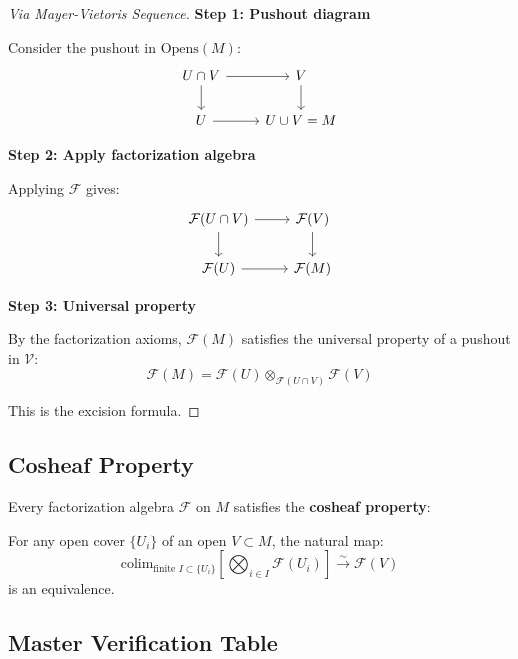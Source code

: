 \begin{example}
\begin{proof}[Via Mayer-Vietoris Sequence]
\textbf{Step 1: Pushout diagram}

Consider the pushout in $\text{Opens}(M)$:
$$\begin{tikzcd}
U \cap V \arrow[r] \arrow[d] & V \arrow[d] \\
U \arrow[r] & U \cup V = M
\end{tikzcd}$$

\textbf{Step 2: Apply factorization algebra}

Applying $\mathcal{F}$ gives:
$$\begin{tikzcd}
\mathcal{F}(U \cap V) \arrow[r] \arrow[d] & \mathcal{F}(V) \arrow[d] \\
\mathcal{F}(U) \arrow[r] & \mathcal{F}(M)
\end{tikzcd}$$

\textbf{Step 3: Universal property}

By the factorization axioms, $\mathcal{F}(M)$ satisfies the universal property of 
a pushout in $\mathcal{V}$:
$$\mathcal{F}(M) = \mathcal{F}(U) \otimes_{\mathcal{F}(U \cap V)} \mathcal{F}(V)$$

This is the excision formula.
\end{proof}

\subsection{Cosheaf Property}

\begin{theorem}
\label{thm:factorization-cosheaf}
Every factorization algebra $\mathcal{F}$ on $M$ satisfies the \textbf{cosheaf property}:

For any open cover $\{U_i\}$ of an open $V \subset M$, the natural map:
$$\text{colim}_{\text{finite } I \subset \{U_i\}} 
   \left[\bigotimes_{i \in I} \mathcal{F}(U_i)\right] \xrightarrow{\sim} \mathcal{F}(V)$$
is an equivalence.
\end{theorem}

\subsection{Master Verification Table}


\end{example}
